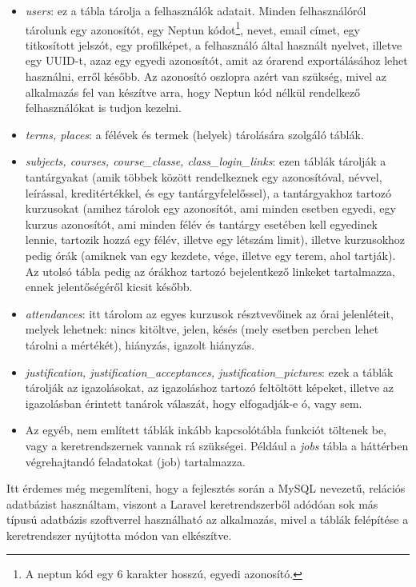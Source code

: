 \documentclass[
]{thesis-ekf}
\theoremstyle{definition}
\theoremstyle{remark}
\begin{document}
\begin{itemize}
	\item \emph{users}: ez a tábla tárolja a felhasználók adatait. Minden felhasználóról tárolunk egy azonosítót, egy Neptun\cite{Neptun} kódot\footnote{A neptun kód egy 6 karakter hosszú, egyedi azonosító.}, nevet, email címet, egy titkosított jelszót, egy profilképet, a felhasználó által használt nyelvet, illetve egy UUID-t, azaz egy egyedi azonosítót, amit az órarend exportálásához lehet használni, erről később. Az azonosító oszlopra azért van szükség, mivel az alkalmazás fel van készítve arra, hogy Neptun kód nélkül rendelkező felhasználókat is tudjon kezelni.
	\item \emph{terms, places}: a félévek és termek (helyek) tárolására szolgáló táblák.
	\item \emph{subjects, courses, course\_classe, class\_login\_links}: ezen táblák tárolják a tantárgyakat (amik többek között rendelkeznek egy azonosítóval, névvel, leírással, kreditértékkel, és egy tantárgyfelelőssel), a tantárgyakhoz tartozó kurzusokat (amihez tárolok egy azonosítót, ami minden esetben egyedi, egy kurzus azonosítót, ami minden félév és tantárgy esetében kell egyedinek lennie, tartozik hozzá egy félév, illetve egy létszám limit), illetve kurzusokhoz pedig órák (amiknek van egy kezdete, vége, illetve egy terem, ahol tartják). Az utolsó tábla pedig az órákhoz tartozó bejelentkező linkeket tartalmazza, ennek jelentőségéről kicsit később.
	\item  \emph{attendances}: itt tárolom az egyes kurzusok résztvevőinek az órai jelenléteit, melyek lehetnek: nincs kitöltve, jelen, késés (mely esetben percben lehet tárolni a mértékét), hiányzás, igazolt hiányzás.
	\item \emph{justification, justification\_acceptances, justification\_pictures}: ezek a táblák tárolják az igazolásokat, az igazoláshoz tartozó feltöltött képeket, illetve az igazolásban érintett tanárok válaszát, hogy elfogadják-e ó, vagy sem.
	\item Az egyéb, nem említett táblák inkább kapcsolótábla funkciót töltenek be, vagy a keretrendszernek vannak rá szükségei. Például a \emph{jobs} tábla a háttérben végrehajtandó feladatokat (job) tartalmazza.
\end{itemize}

Itt érdemes még megemlíteni, hogy a fejlesztés során a MySQL nevezetű, relációs adatbázist használtam, viszont a Laravel keretrendszerből adódóan sok más típusú adatbázis szoftverrel használható az alkalmazás, mivel a táblák felépítése a keretrendszer nyújtotta módon van elkészítve.
\end{document}
